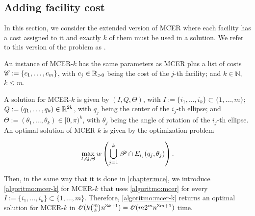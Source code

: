 \subsection{Adding facility cost}

In this section, we consider the extended version of MCER where each facility has a cost assigned to it and exactly $k$ of them must be used in a solution. We refer to this version of the problem as . 

An instance of MCER-$k$ has the same parameters as MCER plus a list of costs \mbox{$\mathscr{C}:=\{c_1, \dots, c_m\}$}, with $c_j\in\mathbb{R}_{>0}$ being the cost of the $j$-th facility; and $k\in\mathbb{N}$, $k\le m$.

A solution for MCER-$k$ is given by $(I, Q, \Theta)$, with $I:=\{i_1, \dots, i_k\}\subset \{1, \dots, m\}$; \\\mbox{$Q:=(q_1, \dots, q_k)\in\mathbb{R}^{2k}$}, with $q_j$ being the center of the $i_j$-th ellipse; and \mbox{$\Theta:=(\theta_1, \dots, \theta_k) \in [0, \pi)^k$}, with $\theta_j$ being the angle of rotation of the $i_j$-th ellipse. An optimal solution of MCER-$k$ is given by the optimization problem

\begin{equation*}
	\max_{I, Q, \Theta} w\left(\bigcup_{j=1}^k \mathscr{P} \cap E_{i_j}(q_j, \theta_j)\right).
\end{equation*}

Then, in the same way that it is done in \autoref{chapter:mce}, we introduce \autoref{algoritmo:mcer-k} for MCER-$k$ that uses \autoref{algoritmo:mcer} for every $I:=\{i_1, \dots, i_k\} \subset \{1, \dots, m\}$. Therefore, \autoref{algoritmo:mcer-k} returns an optimal solution for MCER-$k$ in $\mathscr{O}(k\binom{m}{k}n^{3k+1}) = \mathscr{O}(m2^mn^{3m+1})$ time.

